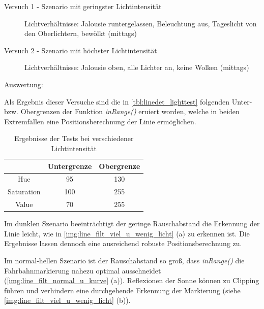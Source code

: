 \documentclass[12pt, a4paper]{scrartcl}
\begin{document}
\begin{description}
	\item[Versuch 1 - Szenario mit geringster Lichtintensität]
	Lichtverhältnisse:	Jalousie runtergelassen, Beleuchtung aus, Tageslicht von den Oberlichtern, bewölkt (mittags)
	\item[Versuch 2 - Szenario mit höchster Lichtintensität]
	Lichtverhältnisse:	Jalousie oben, alle Lichter an, keine Wolken (mittags) 
\end{description}

Auswertung:

Als Ergebnis dieser Versuche sind die in \autoref{tbl:linedet_lighttest} folgenden Unter- bzw. Obergrenzen der Funktion \emph{inRange()} eruiert worden, welche in beiden Extremfällen eine Positionsberechnung der Linie ermöglichen.

\begin{table}[h]
	\caption{Ergebnisse der Tests bei verschiedener Lichtintensität}
	\centering
	\begin{tabular}{ c | c | c |}
		& Untergrenze & Obergrenze \\ \hline
		Hue & 95 & 130 \\ \hline
		Saturation & 100 & 255 \\ \hline
		Value & 70 & 255 \\
	\end{tabular}
	\label{tbl:linedet_lighttest}
\end{table}

Im dunklen Szenario beeinträchtigt der geringe Rauschabstand die Erkennung der Linie leicht, wie in \autoref{img:line_filt_viel_u_wenig_licht} (a) zu erkennen ist. Die Ergebnisse lassen dennoch eine ausreichend robuste Positionsberechnung zu.

Im normal-hellen Szenario ist der Rauschabstand so groß, dass \emph{inRange()} die Fahrbahnmarkierung nahezu optimal ausschneidet (\autoref{img:line_filt_normal_u_kurve} (a)). Reflexionen der Sonne können zu Clipping führen und verhindern eine durchgehende Erkennung der Markierung (siehe \autoref{img:line_filt_viel_u_wenig_licht} (b)).
\end{document}
